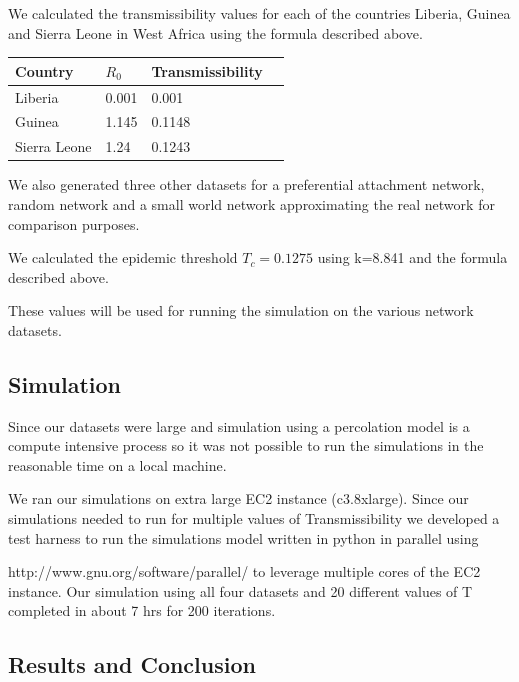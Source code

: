 \documentclass[10pt, journal,onecolumn]{IEEEtran}
\begin{document}
We calculated the transmissibility values for each of the countries Liberia, Guinea and Sierra Leone in West Africa  using the formula described above. 

\begin{center}
    \begin{tabular}{ | l | l | l | p{5cm} |}
    \hline
    Country & $R_0$ & Transmissibility \\ \hline
    Liberia & 0.001 & 0.001  \\ \hline
    Guinea & 1.145 & 0.1148 \\ \hline
    Sierra Leone & 1.24 & 0.1243  \\ \hline
    \end{tabular}
\end{center}

We also generated three other datasets  for a preferential attachment network, random network and a small world network approximating the real network for comparison purposes.

We calculated the epidemic threshold  $T_c=0.1275$  using k=8.841 and the formula described above.

These values will be used for running the simulation on the various network datasets.

\subsection*{\textbf{Simulation}}

Since our datasets were  large and simulation using a percolation model is a compute intensive process so it was not possible to run the simulations in the reasonable time on a local machine.

We ran our simulations on  extra large EC2 instance (c3.8xlarge). Since our simulations needed to run for multiple values  of Transmissibility we developed a test harness to  run the simulations  model written in  python in parallel using 

http://www.gnu.org/software/parallel/ to leverage  multiple  cores of the EC2 instance.  Our simulation using  all four datasets and 20 different values of T  completed in  about 7 hrs for 200 iterations.


\subsection*{\textbf{Results and Conclusion}}
\end{document}
